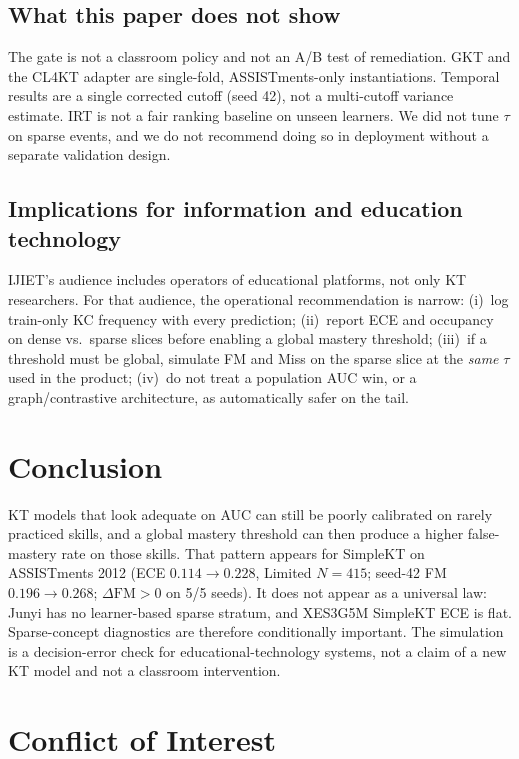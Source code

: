 \documentclass[journal,10pt,twocolumn]{IEEEtran}
\begin{document}
\subsection{What this paper does not show}

The gate is not a classroom policy and not an A/B test of remediation. GKT and the CL4KT adapter are single-fold, ASSISTments-only instantiations. Temporal results are a single corrected cutoff (seed 42), not a multi-cutoff variance estimate. IRT is not a fair ranking baseline on unseen learners. We did not tune $\tau$ on sparse events, and we do not recommend doing so in deployment without a separate validation design.

\subsection{Implications for information and education technology}

IJIET's audience includes operators of educational platforms, not only KT researchers. For that audience, the operational recommendation is narrow: (i)~log train-only KC frequency with every prediction; (ii)~report ECE and occupancy on dense vs.\ sparse slices before enabling a global mastery threshold; (iii)~if a threshold must be global, simulate FM and Miss on the sparse slice at the \emph{same} $\tau$ used in the product; (iv)~do not treat a population AUC win, or a graph/contrastive architecture, as automatically safer on the tail.

\section{Conclusion}

KT models that look adequate on AUC can still be poorly calibrated on rarely practiced skills, and a global mastery threshold can then produce a higher false-mastery rate on those skills. That pattern appears for SimpleKT on ASSISTments 2012 (ECE $0.114\to 0.228$, Limited $N=415$; seed-42 FM $0.196\to 0.268$; $\Delta\mathrm{FM}>0$ on 5/5 seeds). It does not appear as a universal law: Junyi has no learner-based sparse stratum, and XES3G5M SimpleKT ECE is flat. Sparse-concept diagnostics are therefore conditionally important. The simulation is a decision-error check for educational-technology systems, not a claim of a new KT model and not a classroom intervention.

\section*{Conflict of Interest}
\end{document}
